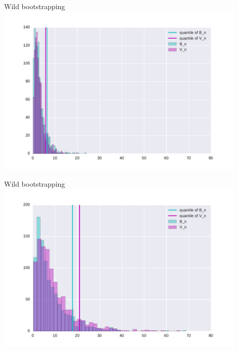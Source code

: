 \documentclass{beamer}
\begin{document}
 \begin{frame}{Wild bootstrapping}
 \includegraphics[width=0.9\textwidth]{./img/bootstrapWorks4.pdf}
\end{frame}

 \begin{frame}{Wild bootstrapping}
 \includegraphics[width=0.9\textwidth]{./img/bootstrapWorks8.pdf}
\end{frame}
\end{document}
